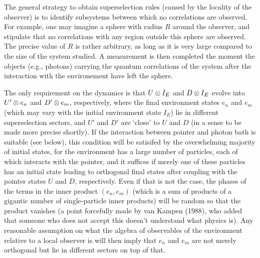 The general strategy to obtain superselection rules (caused by the locality of
the observer) is to
identify subsystems between which no correlations are observed. For example,
one may imagine a
sphere with radius $R$ around the observer, and stipulate that no correlations
with
any region outside this sphere are observed. The precise value of $R$ is rather arbitrary, as long
as it is  very large compared to the size of the system studied. A
measurement is then
completed the moment the objects (e.g., photons) carrying the quantum
correlations of the system
after the interaction with the environement have left the sphere.

The only requirement on the dynamics is that $U\otimes I_E$ and $D \otimes I_E$ evolve
into $U'\otimes e_n$ and
$D'\otimes e_m$, respectively, where the  final environment states $e_n$ and $e_m$
(which may vary with
the initial environment state
$I_E$) lie in different superselection sectors, and $U'$  and $D'$ are `close'
to $U$ and $D$ (in a
sense to be made more precise shortly). If the interaction between pointer and
photon bath is
suitable (see below), this  condition will be satisifed by the overwhelming
majority of initial
states, for the environment has a large number of particles, each of which
interacts with the
pointer, and it suffices if merely one of these particles has an initial state
leading to orthogonal
final states after coupling with the pointer states $U$ and $D$, respectively.
 Even if that is not the case, the phases of the terms in the inner
product $(e_n,e_m)$ (which is a sum of products of a gigantic number of
single-particle inner
products) will be random so that the product vanishes (a point forcefully made
by van Kampen (1988),
who added that someone who does not accept this doesn't understand what physics
is).
Any reasonable assumption on what the   algebra of observables of the
environment relative to a
local observer is will then imply that $e_n$ and $e_m$ are not merely
orthogonal but lie in
different sectors on top of that.

